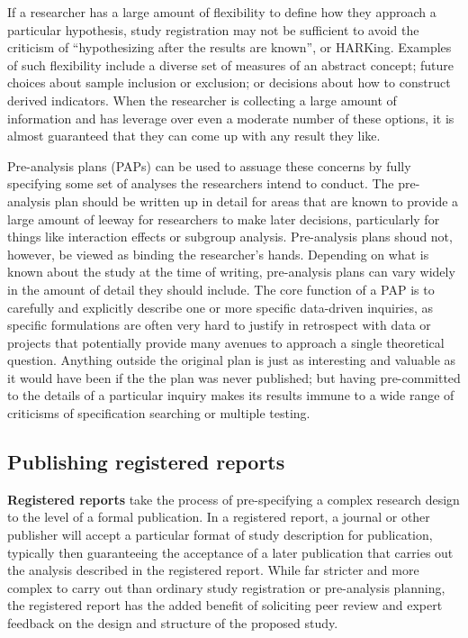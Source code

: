 If a researcher has a large amount of flexibility
to define how they approach a particular hypothesis,
study registration may not be sufficient to avoid the criticism of
``hypothesizing after the results are known'', or HARKing.\cite{kerr1998harking}
Examples of such flexibility include a diverse set of measures of an abstract concept;
future choices about sample inclusion or exclusion;
or decisions about how to construct derived indicators.
When the researcher is collecting a large amount of information
and has leverage over even a moderate number of these options,
it is almost guaranteed that they can come up with any result they like.\cite{gelman2013garden}

Pre-analysis plans (PAPs) can be used to assuage these concerns
by fully specifying some set of analyses the researchers intend to conduct.
The pre-analysis plan should be written up in detail
for areas that are known to provide a large amount of leeway
for researchers to make later decisions,
particularly for things like interaction effects or subgroup analysis.
Pre-analysis plans shoud not, however, be viewed as binding the researcher's hands.\cite{olken2015promises}
Depending on what is known about the study at the time of writing,
pre-analysis plans can vary widely in the amount of detail they should include.
The core function of a PAP is to carefully and explicitly describe
one or more specific data-driven inquiries,
as specific formulations are often very hard to justify in retrospect
with data or projects that potentially provide many avenues to approach
a single theoretical question.
Anything outside the original plan is just as interesting and valuable
as it would have been if the the plan was never published;
but having pre-committed to the details of a particular inquiry makes its results
immune to a wide range of criticisms of specification searching or multiple testing.\cite{duflo2020praise}


\subsection{Publishing registered reports}

\textbf{Registered reports}
take the process of pre-specifying a complex research design
to the level of a formal publication.
In a registered report, a journal or other publisher
will accept a particular format of study description for publication,
typically then guaranteeing the acceptance of a later publication
that carries out the analysis described in the registered report.
While far stricter and more complex to carry out than
ordinary study registration or pre-analysis planning,
the registered report has the added benefit
of soliciting peer review and expert feedback
on the design and structure of the proposed study.

